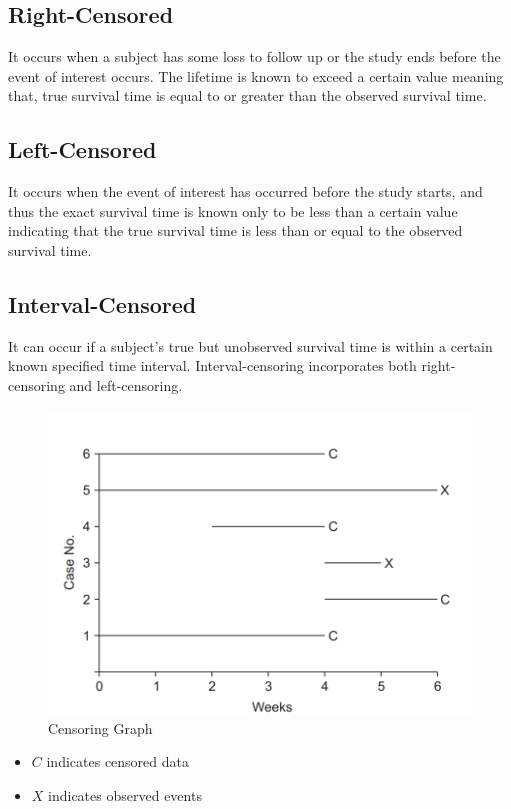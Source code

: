\documentclass[doublespacing]{report} %
\begin{document}
\subsection{Right-Censored}

It occurs when a subject has some loss to follow up or the study ends before the event of interest occurs. The lifetime is known to exceed a certain value meaning that, true survival time is equal to or greater than the observed survival time.

\subsection{Left-Censored}

It occurs when the event of interest has occurred before the study starts, and thus the exact survival time is known only to be less than a certain value indicating that the true survival time is less than or equal to the observed survival time.

\subsection{Interval-Censored}
It can occur if a subject’s true but unobserved survival time is within a certain known specified time interval. Interval-censoring incorporates both right-censoring and left-censoring. 

\begin{figure}[H]
    \centering
    \includegraphics[width=0.5\linewidth]{Figure 3/3.2.png}
    \caption{Censoring Graph}
    \label{Figure 3.2}
\end{figure}


\begin{itemize}

\item \(C\) indicates censored data
\item  \(X\) indicates observed events


\end{itemize}
\end{document}
